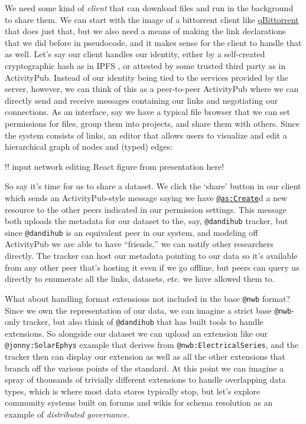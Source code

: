 \documentclass[notoc]{tufte-book}
\begin{document}
We need some kind of \emph{client} that can download files and run in
the background to share them. We can start with the image of a
bittorrent client like \href{https://www.qbittorrent.org/}{qBittorrent}
that does just that, but we also need a means of making the link
declarations that we did before in pseudocode, and it makes sense for
the client to handle that as well. Let's say our client handles our
identity, either by a self-created cryptographic hash as in IPFS\citep{benetIPFSContentAddressed2014} , or attested by some trusted
third party as in ActivityPub. Instead of our identity being tied to the
services provided by the server, however, we can think of this as a
peer-to-peer ActivityPub where we can directly send and receive messages
containing our links and negotiating our connections. As an interface,
say we have a typical file browser that we can set permissions for
files, group them into projects, and share them with others. Since the
system consists of links, an editor that allows users to visualize and
edit a hierarchical graph of nodes and (typed) edges:

!! input network editing React figure from presentation here!

So say it's time for us to share a dataset. We click the `share' button
in our client which sends an ActivityPub-style message saying we have
\href{https://www.w3.org/TR/activitystreams-vocabulary/\#dfn-create}{\texttt{@as:Create}}d
a new resource to the other peers indicated in our permission settings.
This message both uploads the metadata for our dataset to the, say,
\texttt{@dandihub} tracker, but since \texttt{@dandihub} is an
equivalent peer in our system, and modeling off ActivityPub we are able
to have ``friends,'' we can notify other researchers directly. The
tracker can host our metadata pointing to our data so it's available
from any other peer that's hosting it even if we go offline, but peers
can query us directly to enumerate all the links, datasets, etc. we have
allowed them to.

What about handling format extensions not included in the base
\texttt{@nwb} format? Since we own the representation of our data, we
can imagine a strict base \texttt{@nwb}-only tracker, but also think of
\texttt{@dandihub} that has built tools to handle extensions. So
alongside our dataset we can upload an extension like our
\texttt{@jonny:SolarEphys} example that derives from
\texttt{@nwb:ElectricalSeries}, and the tracker then can display our
extension as well as all the other extensions that branch off the
various points of the standard. At this point we can imagine a spray of
thousands of trivially different extensions to handle overlapping data
types, which is where most data stores typically stop, but let's explore
community systems built on forums and wikis for schema resolution as an
example of \emph{distributed governance.}
\end{document}
